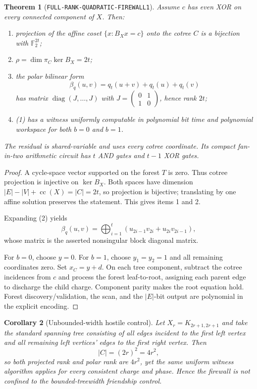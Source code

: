 \documentclass[11pt]{article}
\newtheorem{theorem}{Theorem}
\newtheorem{corollary}[theorem]{Corollary}
\newcommand{\F}{\mathbb F_2}
\begin{document}
\begin{theorem}[\texttt{FULL-RANK-QUADRATIC-FIREWALL1}]
Assume $c$ has even XOR on every connected component of $X$.  Then:
\begin{enumerate}
\item projection of the affine coset $\{x:B_Xx=c\}$ onto the cotree $C$ is
a bijection with $\F^{2t}$;
\item $\rho=\dim\pi_C\ker B_X=2t$;
\item the polar bilinear form
\[
 \beta_q(u,v)=q_t(u+v)+q_t(u)+q_t(v)
\]
has matrix $\operatorname{diag}(J,\ldots,J)$ with
$J=\left(\begin{smallmatrix}0&1\\1&0\end{smallmatrix}\right)$, hence rank
$2t$;
\item (1) has a witness uniformly computable in polynomial bit time and
polynomial workspace for both $b=0$ and $b=1$.
\end{enumerate}
The residual is shared-variable and uses every cotree coordinate.  Its compact
fan-in-two arithmetic circuit has $t$ AND gates and $t-1$ XOR gates.
\end{theorem}
\begin{proof}
A cycle-space vector supported on the forest $T$ is zero.  Thus cotree
projection is injective on $\ker B_X$.  Both spaces have dimension
$|E|-|V|+\operatorname{cc}(X)=|C|=2t$, so projection is bijective; translating
by one affine solution preserves the statement.  This gives items 1 and 2.

Expanding (2) yields
\[
 \beta_q(u,v)=\bigoplus_{i=1}^{t}
 (u_{2i-1}v_{2i}+u_{2i}v_{2i-1}),
\]
whose matrix is the asserted nonsingular block diagonal matrix.

For $b=0$, choose $y=0$.  For $b=1$, choose
$y_1=y_2=1$ and all remaining coordinates zero.  Set
$x_C=y+d$.  On each tree component, subtract the cotree incidences from $c$
and process the forest leaf-to-root, assigning each parent edge to discharge
the child charge.  Component parity makes the root equation hold.  Forest
discovery/validation, the scan, and the $|E|$-bit output are polynomial in the
explicit encoding.
\end{proof}

\begin{corollary}[Unbounded-width hostile control]
Let $X_r=K_{2r+1,2r+1}$ and take the standard spanning tree consisting of all
edges incident to the first left vertex and all remaining left vertices'
edges to the first right vertex.  Then
\[
 |C|=(2r)^2=4r^2,
\]
so both projected rank and polar rank are $4r^2$, yet the same uniform
witness algorithm applies for every consistent charge and phase.  Hence the
firewall is not confined to the bounded-treewidth friendship control.
\end{corollary}
\end{document}

